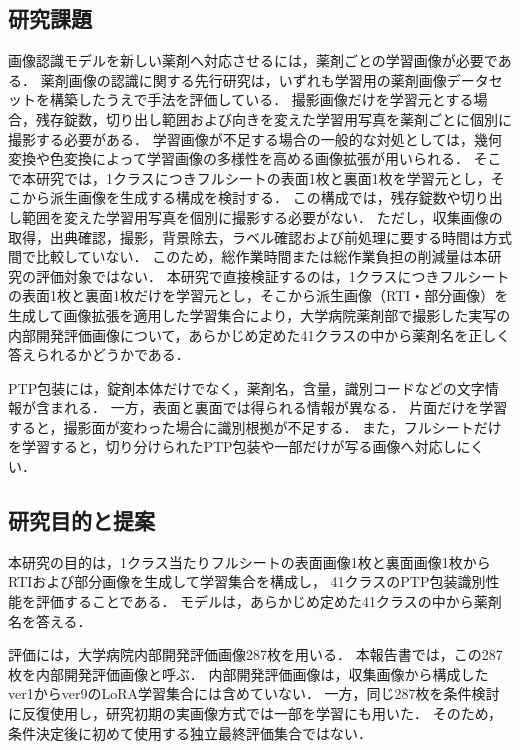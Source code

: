 \documentclass[uplatex,dvipdfmx]{jsarticle}
\begin{document}
\subsection{研究課題}\label{sec:research_question}

画像認識モデルを新しい薬剤へ対応させるには，薬剤ごとの学習画像が必要である．
薬剤画像の認識に関する先行研究は，いずれも学習用の薬剤画像データセットを構築したうえで手法を評価している\cite{heo2023pill,radli2024word,radli2024metric}．
撮影画像だけを学習元とする場合，残存錠数，切り出し範囲および向きを変えた学習用写真を薬剤ごとに個別に撮影する必要がある．
学習画像が不足する場合の一般的な対処としては，幾何変換や色変換によって学習画像の多様性を高める画像拡張が用いられる\cite{shorten2019augmentation}．
そこで本研究では，1クラスにつきフルシートの表面1枚と裏面1枚を学習元とし，そこから派生画像を生成する構成を検討する．
この構成では，残存錠数や切り出し範囲を変えた学習用写真を個別に撮影する必要がない．
ただし，収集画像の取得，出典確認，撮影，背景除去，ラベル確認および前処理に要する時間は方式間で比較していない．
このため，総作業時間または総作業負担の削減量は本研究の評価対象ではない．
本研究で直接検証するのは，1クラスにつきフルシートの表面1枚と裏面1枚だけを学習元とし，そこから派生画像（RTI・部分画像）を生成して画像拡張を適用した学習集合により，大学病院薬剤部で撮影した実写の内部開発評価画像について，あらかじめ定めた41クラスの中から薬剤名を正しく答えられるかどうかである．

PTP包装には，錠剤本体だけでなく，薬剤名，含量，識別コードなどの文字情報が含まれる．
一方，表面と裏面では得られる情報が異なる．
片面だけを学習すると，撮影面が変わった場合に識別根拠が不足する．
また，フルシートだけを学習すると，切り分けられたPTP包装や一部だけが写る画像へ対応しにくい．

\subsection{研究目的と提案}

本研究の目的は，1クラス当たりフルシートの表面画像1枚と裏面画像1枚からRTIおよび部分画像を生成して学習集合を構成し，
41クラスのPTP包装識別性能を評価することである．
モデルは，あらかじめ定めた41クラスの中から薬剤名を答える．

評価には，大学病院内部開発評価画像287枚を用いる．
本報告書では，この287枚を内部開発評価画像と呼ぶ．
内部開発評価画像は，収集画像から構成したver1からver9のLoRA学習集合には含めていない．
一方，同じ287枚を条件検討に反復使用し，研究初期の実画像方式では一部を学習にも用いた．
そのため，条件決定後に初めて使用する独立最終評価集合ではない．
\end{document}
